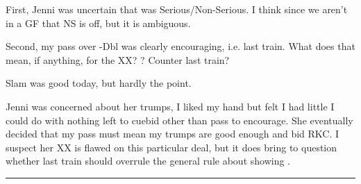 \documentclass[main]{subfile}
\begin{document}
First, Jenni was uncertain that  was Serious/Non-Serious. I think since we aren't in a GF that NS is off, but it is ambiguous.

Second, my pass over -Dbl was clearly encouraging, i.e. last train. What does that mean, if anything, for the XX? \first? Counter last train?

Slam was good today, but hardly the point. 

\begin{handdiagram}
\end{handdiagram}

Jenni was concerned about her trumps, I liked my hand but felt I had little I could do with nothing left to cuebid other than pass to encourage. She eventually decided that my pass must mean my trumps are good enough and bid RKC. I suspect her XX is flawed on this particular deal, but it does bring to question whether last train should overrule the general rule about showing \first.

\vspace{1em}\hrule
\end{document}
